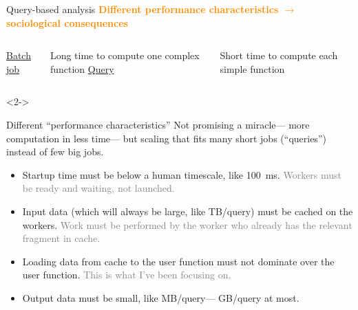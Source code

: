 \documentclass[aspectratio=169]{beamer}
\begin{document}
\begin{frame}{Query-based analysis}
\large
\vspace{0.5 cm}
\textcolor{darkorange}{\bf Different performance characteristics $\to$ sociological consequences}

\vspace{1 cm}
\begin{columns}
\underline{\Large Batch job}

\vspace{0.2 cm}
Long time to compute one complex function
\underline{\Large Query}

\vspace{0.2 cm}
Short time to compute each simple function
\end{columns}

\vspace{1 cm}
\begin{uncoverenv}<2->
 \hfill {}
\end{uncoverenv}
\end{frame}

\begin{frame}{Different ``performance characteristics''}
\large
\vspace{0.5 cm}
Not promising a miracle--- more computation in less time--- but scaling that fits many short jobs (``queries'') instead of few big jobs.

\vspace{0.5 cm}

\vspace{0.2 cm}
\begin{itemize}
\item<3-> Startup time must be below a human timescale, like 100~ms. \textcolor{gray}{Workers must be ready and waiting, not launched.}
\item<4-> Input data (which will always be large, like TB/query) must be cached on the workers. \textcolor{gray}{Work must be performed by the worker who already has the relevant fragment in cache.}
\item<5-> Loading data from cache to the user function must not dominate over the user function. \textcolor{gray}{This is what I've been focusing on.}
\item<6-> Output data must be small, like MB/query--- GB/query at most.
\end{itemize}
\end{frame}
\end{document}
